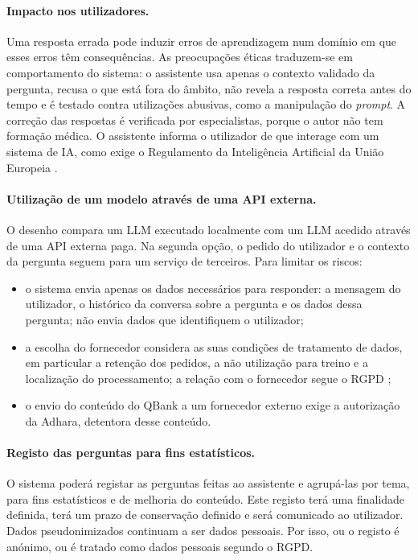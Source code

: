 \paragraph{Impacto nos utilizadores.} Uma resposta errada pode induzir erros de aprendizagem num domínio em que esses erros têm consequências. As preocupações éticas traduzem-se em comportamento do sistema: o assistente usa apenas o contexto validado da pergunta, recusa o que está fora do âmbito, não revela a resposta correta antes do tempo e é testado contra utilizações abusivas, como a manipulação do \emph{prompt}. A correção das respostas é verificada por especialistas, porque o autor não tem formação médica. O assistente informa o utilizador de que interage com um sistema de \gls{IA}, como exige o Regulamento da Inteligência Artificial da União Europeia \parencite{eu2024aiact}.

\paragraph{Utilização de um modelo através de uma API externa.} O desenho compara um \gls{LLM} executado localmente com um \gls{LLM} acedido através de uma \gls{API} externa paga. Na segunda opção, o pedido do utilizador e o contexto da pergunta seguem para um serviço de terceiros. Para limitar os riscos:
\begin{itemize}
    \item o sistema envia apenas os dados necessários para responder: a mensagem do utilizador, o histórico da conversa sobre a pergunta e os dados dessa pergunta; não envia dados que identifiquem o utilizador;
    \item a escolha do fornecedor considera as suas condições de tratamento de dados, em particular a retenção dos pedidos, a não utilização para treino e a localização do processamento; a relação com o fornecedor segue o \gls{RGPD} \parencite{eu2016gdpr};
    \item o envio do conteúdo do QBank a um fornecedor externo exige a autorização da Adhara, detentora desse conteúdo.
\end{itemize}

\paragraph{Registo das perguntas para fins estatísticos.} O sistema poderá registar as perguntas feitas ao assistente e agrupá-las por tema, para fins estatísticos e de melhoria do conteúdo. Este registo terá uma finalidade definida, terá um prazo de conservação definido e será comunicado ao utilizador. Dados pseudonimizados continuam a ser dados pessoais. Por isso, ou o registo é anónimo, ou é tratado como dados pessoais segundo o \gls{RGPD}.

